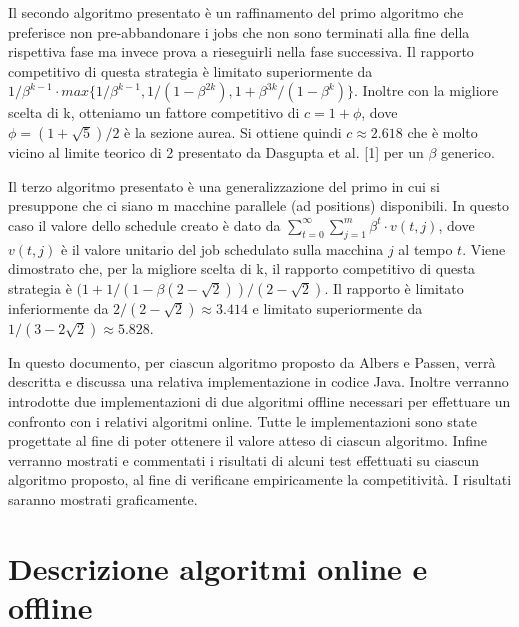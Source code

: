 \documentclass[twoside,openany,titlepage,fleqn,
	headinclude,12pt,a4paper,BCOR5mm,footinclude]{scrbook}
\begin{document}
Il secondo algoritmo presentato è un raffinamento del primo algoritmo che preferisce non pre-abbandonare i jobs che non sono terminati alla fine della rispettiva fase ma invece prova a rieseguirli nella fase successiva. Il rapporto competitivo di questa strategia è limitato superiormente da $1/\beta^{k-1} \cdot max\{1/\beta^{k-1}, 1/(1 - \beta^{2k} ), 1 + \beta^{3k}/(1 - \beta^{k} )\}$. Inoltre con la migliore scelta di k, otteniamo un fattore competitivo di $c = 1 + \phi$, dove $\phi = (1 + \sqrt{5})/2$ è la sezione aurea. Si ottiene quindi $c \approx 2.618$ che è molto vicino al limite teorico di 2 presentato da Dasgupta et al. [1] per un $\beta$ generico.

Il terzo algoritmo presentato è una generalizzazione del primo in cui si presuppone che ci siano m macchine parallele (ad positions) disponibili. In questo caso il valore dello schedule creato è dato da $\sum_ {t = 0}^{\infty}\sum_{j = 1}^{m}\beta^{t}\cdot v(t,j)$, dove $v(t,j)$ è il valore unitario del job schedulato sulla macchina $j$ al tempo $t$. Viene dimostrato che, per la migliore scelta di k, il rapporto competitivo di questa strategia è $(1 + 1/(1 - \beta(2 - \sqrt{2}))/(2 - \sqrt{2})$. Il rapporto è limitato inferiormente da $2/(2-\sqrt{2}) \approx 3.414$ e limitato superiormente da $1/(3 - 2\sqrt{2}) \approx 5.828$.

In questo documento, per ciascun algoritmo proposto da Albers e Passen, verrà descritta e discussa una relativa implementazione in codice Java. Inoltre verranno introdotte due implementazioni di due algoritmi offline necessari per effettuare un confronto con i relativi algoritmi online. Tutte le implementazioni sono state progettate al fine di poter ottenere il valore atteso di ciascun algoritmo. Infine verranno mostrati e commentati i risultati di alcuni test effettuati su ciascun algoritmo proposto, al fine di verificane empiricamente la competitività. I risultati saranno mostrati graficamente.
\chapter{Descrizione algoritmi online e offline}
\end{document}
